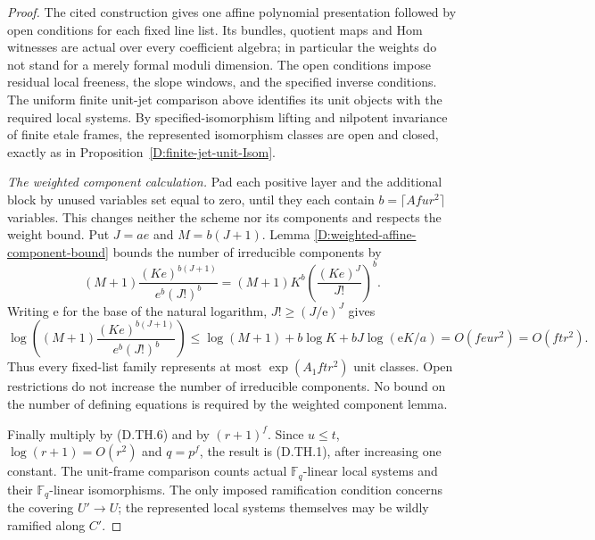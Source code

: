 \begin{proof}
The cited construction gives one affine polynomial
presentation followed by open conditions for each fixed
line list. Its bundles, quotient maps and Hom witnesses
are actual over every coefficient algebra; in particular
the weights do not stand for a merely formal moduli
dimension. The open conditions impose residual local
freeness, the slope windows, and the specified inverse
conditions. The uniform finite unit-jet comparison above
identifies its unit objects with the required local
systems. By specified-isomorphism lifting and nilpotent
invariance of finite etale frames, the represented
isomorphism classes are open and closed, exactly as in
Proposition~\ref{D:finite-jet-unit-Isom}.

\emph{The weighted component calculation.}
Pad each positive layer and the additional block by
unused variables set equal to zero, until they each
contain $b=\lceil Afur^2\rceil$ variables. This changes
neither the scheme nor its components and respects the
weight bound. Put $J=ae$ and $M=b(J+1)$. Lemma
\ref{D:weighted-affine-component-bound} bounds the
number of irreducible components by
\[
 (M+1)\frac{(Ke)^{b(J+1)}}{e^b(J!)^b}
     =(M+1)K^b\left(\frac{(Ke)^J}{J!}\right)^b.
                                                        \tag{D.TH.9}
\]
Writing $\mathrm e$ for the base of the natural logarithm,
$J!\geq(J/\mathrm e)^J$ gives
\[
 \log\!\left((M+1)\frac{(Ke)^{b(J+1)}}{e^b(J!)^b}\right)
 \leq\log(M+1)+b\log K+bJ\log(\mathrm e K/a)
                         =O(feur^2)=O(ftr^2).          \tag{D.TH.10}
\]
Thus every fixed-list family represents at most
$\exp(A_1ftr^2)$ unit classes. Open restrictions do not
increase the number of irreducible components. No bound
on the number of defining equations is required by the
weighted component lemma.

Finally multiply by (D.TH.6) and by $(r+1)^f$.
Since $u\leq t$, $\log(r+1)=O(r^2)$ and $q=p^f$,
the result is (D.TH.1), after increasing one constant.
The unit-frame comparison counts actual
$\mathbb F_q$-linear local systems and their
$\mathbb F_q$-linear isomorphisms. The only imposed
ramification condition concerns the covering $U'\to U$;
the represented local systems themselves may be wildly
ramified along $C'$.
\end{proof}
